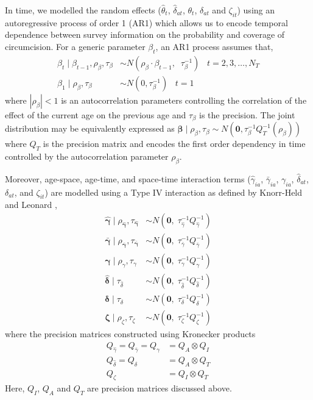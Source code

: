 \documentclass{article}
\begin{document}
\begin{appendix}
In time, we modelled the random effects ($\hat{\theta}_t$, $\hat{\delta}_{at}$, $\theta_t$, $\delta_{at}$ and $\zeta_{it}$) using an autoregressive process of order 1 (AR1) which allows us to encode temporal dependence between survey information on the probability and coverage of circumcision. For a generic parameter $\beta_t$, an AR1 process assumes that,
\begin{align*} 
  \beta_{t} \; | \; \beta_{t-1}, \rho_{\beta}, \tau_{\beta} &\sim N(\rho_{\beta} \cdot \beta_{t-1}, \;\; \tau^{-1}_{\beta}) \;\;\;  t = 2, 3,\ldots, N_T \\
  \beta_{1} \; | \; \rho_{\beta}, \tau_{\beta} &\sim N(0, \tau^{-1}_{\beta})  \;\;\;  t = 1
\end{align*}
where $|\rho_{\beta}| < 1$ is an autocorrelation parameters controlling the correlation of the effect of the current age on the previous age and $\tau_{\beta}$ is the precision. The joint distribution may be equivalently expressed as $\boldsymbol{\beta}\; | \; \rho_{\beta}, \tau_{\beta} \sim N(\boldsymbol{0}, \tau_{\beta}^{-1}Q^{-1}_{T}(\rho_{\beta}))$ where $Q_{T}$ is the precision matrix and encodes the first order dependency in time controlled by the autocorrelation parameter $\rho_{\beta}$. 

Moreover, age-space, age-time, and space-time interaction terms ($\hat{\gamma}_{ia}$, $\bar{\gamma}_{ia}$, $\gamma_{ia}$, $\hat{\delta}_{at}$, $\delta_{at}$, and $\zeta_{it}$) are modelled using a Type IV interaction as defined by Knorr-Held and Leonard \cite{knorr2000bayesian}, 
\begin{align*} 
  \hat{\boldsymbol{\gamma}} \; | \; \rho_{\boldsymbol{\hat{\gamma}}}, \tau_{\boldsymbol{\hat{\gamma}}} &\sim N(\boldsymbol{0}, \;\tau^{-1}_{\hat{\gamma}} Q^{-1}_{\hat{\gamma}}) \\
  \bar{\boldsymbol{\gamma}} \; | \; \rho_{\boldsymbol{\bar{\gamma}}}, \tau_{\boldsymbol{\bar{\gamma}}} &\sim N(\boldsymbol{0}, \;\tau^{-1}_{\bar{\gamma}} Q^{-1}_{\bar{\gamma}}) \\
  \boldsymbol{\gamma} \; | \; \rho_{\gamma}, \tau_{\gamma} &\sim N(\boldsymbol{0}, \;\tau^{-1}_{\gamma} Q^{-1}_{\gamma})\\
  \boldsymbol{\hat{\delta}} \; | \; \tau_{\hat{\delta}} &\sim N(\boldsymbol{0}, \;\tau^{-1}_{\hat{\delta}} Q^{-1}_{\hat{\delta}})\\
  \boldsymbol{\delta} \; | \; \tau_{\delta} &\sim N(\boldsymbol{0}, \;\tau^{-1}_{\delta} Q^{-1}_{\delta})\\
  \boldsymbol{\zeta} \; | \; \rho_{\zeta}, \tau_{\zeta} &\sim N(\boldsymbol{0}, \;\tau^{-1}_{\zeta} Q^{-1}_{\zeta})
\end{align*}
where the precision matrices constructed using Kronecker products 
\begin{align*} 
	Q_{\hat{\gamma}} = Q_{\bar{\gamma}} = Q_{\gamma} &= Q_A \otimes Q_I\\
	Q_{\hat{\delta}} = Q_{\delta} &= Q_A \otimes Q_T\\
	Q_{\zeta} &=Q_I \otimes Q_T
\end{align*}
Here, $Q_I$, $Q_A$ and $Q_T$ are precision matrices discussed above.


\end{appendix}
\end{document}
